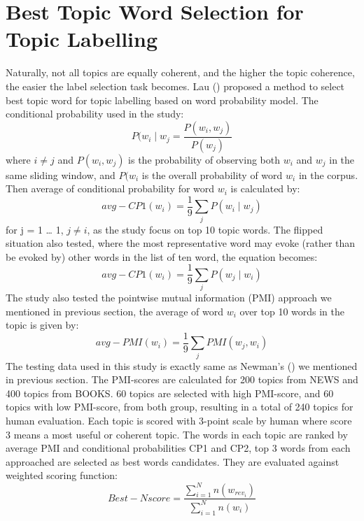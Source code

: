 \documentclass[11pt,twoside]{report}
\begin{document}
\section{Best Topic Word Selection for Topic Labelling}
Naturally, not all topics are equally coherent, and the higher the topic coherence, the easier the label selection task becomes. Lau (\cite{ref33}) proposed a method to select best topic word for topic labelling based on word probability model. The conditional probability used in the study:
\begin{equation}
P(w_{i}\mid w_{j} = \frac{P(w_{i}, w_{j})}{P(w_{j})}
\end{equation}
where $i\neq j$ and $P(w_{i}, w_{j})$ is the probability of observing both $w_{i}$ and $w_{j}$ in the same sliding window, and $P(w_{i}$ is the overall probability of word $w_{i}$ in the corpus. Then average of conditional probability for word $w_{i}$ is calculated by:
\begin{equation}
avg-CP1(w_{i}) = \frac{1}{9} \sum_{j}P(w_{i} \mid w_{j})
\end{equation}
for j = 1 … 1, $j \neq i$, as the study focus on top 10 topic words. The flipped situation also tested, where the most representative word may evoke (rather than be evoked by) other words in the list of ten word, the equation becomes:
\begin{equation}
avg-CP1(w_{i}) = \frac{1}{9} \sum_{j}P(w_{j} \mid w_{i})
\end{equation}
The study also tested the pointwise mutual information (PMI) approach we mentioned in previous section, the average of word $w_{i}$ over top 10 words in the topic is given by:
\begin{equation}
avg-PMI(w_{i}) = \frac{1}{9} \sum_{j}PMI(w_{j}, w_{i})
\end{equation}
The testing data used in this study is exactly same as Newman's (\cite{ref27}) we mentioned in previous section. The PMI-scores are calculated for 200 topics from NEWS and 400 topics from BOOKS. 60 topics are selected with high PMI-score, and 60 topics with low PMI-score, from both group, resulting in a total of 240 topics for human evaluation. Each topic is scored with 3-point scale by human where score 3 means a most useful or coherent topic. The words in each topic are ranked by average PMI and conditional probabilities CP1 and CP2, top 3 words from each approached are selected as best words candidates. They are evaluated against weighted scoring function:
\begin{equation}
Best-N score = \frac{\sum_{i=1}^{N}n(w_{rev_{i}})}{\sum_{i=1}^{N}n(w_{i})}
\end{equation}
\end{document}
